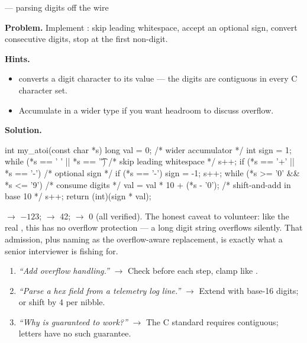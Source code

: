 \begin{gymproblem}{ --- parsing digits off the wire}

\textbf{Problem.} Implement : skip leading
whitespace, accept an optional sign, convert consecutive digits, stop at the
first non-digit.

\textbf{Hints.}
\begin{itemize}
\item {} converts a digit character to its value --- the digits
  are contiguous in every C character set.
\item Accumulate in a wider type if you want headroom to discuss overflow.
\end{itemize}

\attempt

\textbf{Solution.}
\begin{cgym}
int my_atoi(const char *s) {
    long val = 0;                        /* wider accumulator         */
    int sign = 1;
    while (*s == ' ' || *s == '\t') {    /* skip leading whitespace   */
        s++;
    }
    if (*s == '+' || *s == '-') {        /* optional sign             */
        if (*s == '-') {
            sign = -1;
        }
        s++;
    }
    while (*s >= '0' && *s <= '9') {     /* consume digits            */
        val = val * 10 + (*s - '0');     /* shift-and-add in base 10  */
        s++;
    }
    return (int)(sign * val);
}
\end{cgym}

 $\rightarrow$ $-123$;
 $\rightarrow$ 42; 
$\rightarrow$ 0 (all verified). The honest caveat to volunteer: like the real
, this has no overflow protection --- a long digit string
overflows silently. That admission, plus naming  as the
overflow-aware replacement, is exactly what a senior interviewer is fishing
for.

\followups
\begin{enumerate}
\item \emph{``Add overflow handling.''} $\rightarrow$ Check
   before each step, clamp like
  .
\item \emph{``Parse a hex field from a telemetry log line.''} $\rightarrow$
  Extend with base-16 digits; or shift by 4 per nibble.
\item \emph{``Why is  guaranteed to work?''} $\rightarrow$ The
  C standard requires  contiguous; letters have no such
  guarantee.
\end{enumerate}
\end{gymproblem}

